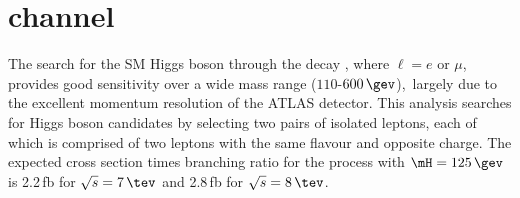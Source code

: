 \documentclass[final,3p,times,twocolumn]{elsarticle}
\begin{document}
\newcommand\pvaluelowmOld{\ensuremath{242\gev}}
\newcommand\pvaluelowOld{0.5\%}
\newcommand\sigmalowOld{2.6}

\newcommand\pvaluehighmOld{\ensuremath{125\gev}}
\newcommand\pvaluehighOld{1.1\%}
\newcommand\sigmahighOld{2.3}

\newcommand\pvaluelowmNew{\ensuremath{125.5\gev}}
\newcommand\pvaluelowNew{0.4\%}
\newcommand\sigmalowNew{2.7}

\newcommand\pvaluehighmNew{\ensuremath{266\gev}}
\newcommand\pvaluehighNew{3.5\%}
\newcommand\sigmahighNew{1.8}

\newcommand\pvaluelowmComb{\ensuremath{125\gev}}
\newcommand\pvaluelowComb{0.018\%}
\newcommand\sigmalowComb{3.6}

\newcommand\pvaluehighmComb{\ensuremath{266\gev}}
\newcommand\pvaluehighComb{1.9\%}
\newcommand\sigmahighComb{2.1}

\newcommand\globalSigmaLowComb{2.5}
\newcommand\globalpvalue{0.65\%}

\newcommand\pvaluehighexp{0.14\%}
\newcommand\sigmahighexp{\ensuremath{3.0}}

\newcommand\pvaluehigh{1.3\%}
\newcommand\sigmahigh{\ensuremath{2.2}}
\newcommand\pvaluehighm{\ensuremath{244\gev}}
\newcommand\pvaluehightwoexp{7.1\%}

\newcommand\sigmahightwoexp{\ensuremath{1.5}}
\newcommand\pvaluehightwo{1.8\%}
\newcommand\sigmahightwo{\ensuremath{2.1}}
\newcommand\pvaluehighmtwo{\ensuremath{500\gev}}

\newcommand\excludedrangeaBrief{131--162}
\newcommand\excludedrangebBrief{170--460}
\newcommand\excludedrangeexpaBrief{124--164}
\newcommand\excludedrangeexpbBrief{176--500}
\newcommand\excludedranges{$\excludedrangeaBrief\,\gev$ and $\excludedrangebBrief\,\gev$}
\newcommand\excludedrangesexp{$\excludedrangeexpaBrief\,\gev$ and $\excludedrangeexpbBrief\,\gev$}

\newcommand\excludedrangesJan{$134\!-\!156\,\gev$, $182\!-\!233\,\gev$, $256\!-\!265\,\gev$ and $268\!-\!415\,\gev$}
\newcommand\excludedrangesexpJan{$136\!-\!157\,\gev$ and $184\!-\!400\,\gev$}
\newcommand\lumiAverageJan{\ensuremath{4.8~\ifb}}

\section{\texorpdfstring{\htollllp{} channel}{H->ZZ(*)->4l channel}}
\label{sec:h4l}

  The search for the SM Higgs boson through the decay \htollllp{},
  where $\ell=e\text{ or }\mu$, provides good sensitivity
  over a wide mass range ($110$-$600\,\gev$),~largely due to the excellent momentum resolution
  of the ATLAS detector. This analysis searches for Higgs boson
  candidates by selecting two pairs of isolated leptons, each of which is comprised of
  two leptons with the same flavour and opposite charge.
  The expected cross section times branching ratio for the process \htollllp{} with
  $\mH=125\,\gev$ is 2.2\,fb for $\sqrt{s}=7\,\tev$ and 2.8\,fb for $\sqrt{s}=8\,\tev$.
\end{document}
